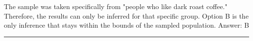 \documentclass[11pt,paper=a4,answers]{exam}
\begin{document}
\begin{questions}
\begin{solution}
The sample was taken specifically from "people who like dark roast coffee." Therefore, the results can only be inferred for that specific group. Option B is the only inference that stays within the bounds of the sampled population.
\vspace{5pt}
Answer: \colorbox{yellow!100}{B}
\end{solution}



\end{questions}
\begin{center}
\rule{.5\textwidth}{1pt}
\end{center}
\end{document}
